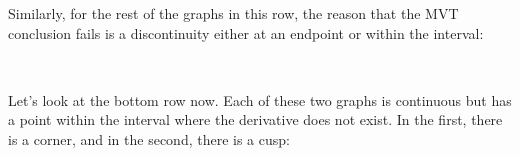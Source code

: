 \documentclass[pdftex, brazil, 12pt, twoside]{article}
\begin{document}
\begin{figure}[H]
  \begin{center}
    \label{fig:mvt-hypot-6}
  \end{center}
\end{figure}

Similarly, for the rest of the graphs in this row,
the reason that the MVT conclusion fails
is a discontinuity either at an endpoint
or within the interval:

\begin{figure}[H]
  \begin{center}
    \label{fig:mvt-hypot-7}
    \\
  \end{center}
\end{figure}

Let's look at the bottom row now.
Each of these two graphs is continuous
but has a point within the interval where
the derivative does not exist.
In the first, there is a corner, and in the second,
there is a cusp:
\end{document}
